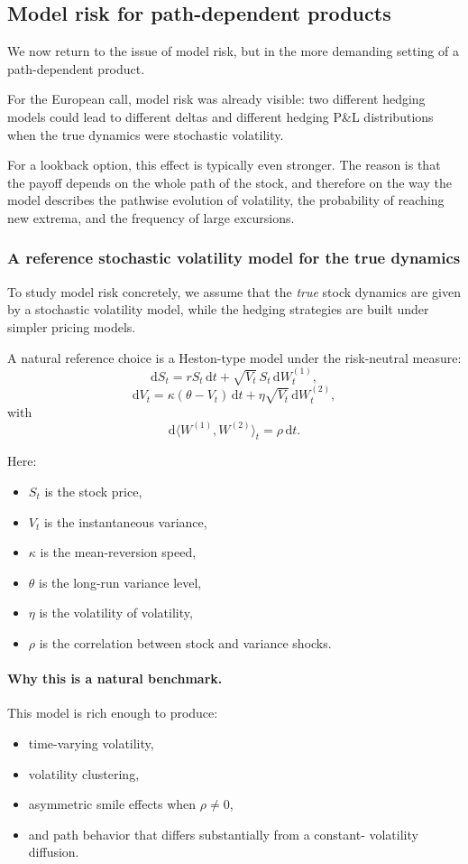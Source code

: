 \documentclass[11pt]{article}
\theoremstyle{plain}
\theoremstyle{definition}
\theoremstyle{remark}
\begin{document}
\subsection{Model risk for path-dependent products}

We now return to the issue of model risk, but in the more demanding
setting of a path-dependent product.

For the European call, model risk was already visible: two different
hedging models could lead to different deltas and different hedging
P\&L distributions when the true dynamics were stochastic volatility.

For a lookback option, this effect is typically even stronger.
The reason is that the payoff depends on the whole path of the stock,
and therefore on the way the model describes the pathwise evolution of
volatility, the probability of reaching new extrema, and the frequency
of large excursions.

\subsubsection{A reference stochastic volatility model for the true dynamics}

To study model risk concretely, we assume that the \emph{true} stock
dynamics are given by a stochastic volatility model, while the hedging
strategies are built under simpler pricing models.

A natural reference choice is a Heston-type model under the
risk-neutral measure:
\[
\mathrm{d}S_t
=
rS_t\,\mathrm{d}t
+
\sqrt{V_t}\,S_t\,\mathrm{d}W_t^{(1)},
\]
\[
\mathrm{d}V_t
=
\kappa(\theta-V_t)\,\mathrm{d}t
+
\eta\sqrt{V_t}\,\mathrm{d}W_t^{(2)},
\]
with
\[
\mathrm{d}\langle W^{(1)},W^{(2)}\rangle_t=\rho\,\mathrm{d}t.
\]

Here:
\begin{itemize}[leftmargin=1.4em]
    \item \(S_t\) is the stock price,
    \item \(V_t\) is the instantaneous variance,
    \item \(\kappa\) is the mean-reversion speed,
    \item \(\theta\) is the long-run variance level,
    \item \(\eta\) is the volatility of volatility,
    \item \(\rho\) is the correlation between stock and variance shocks.
\end{itemize}

\paragraph{Why this is a natural benchmark.}
This model is rich enough to produce:
\begin{itemize}[leftmargin=1.4em]
    \item time-varying volatility,
    \item volatility clustering,
    \item asymmetric smile effects when \(\rho\neq 0\),
    \item and path behavior that differs substantially from a constant-
    volatility diffusion.
\end{itemize}
\end{document}
